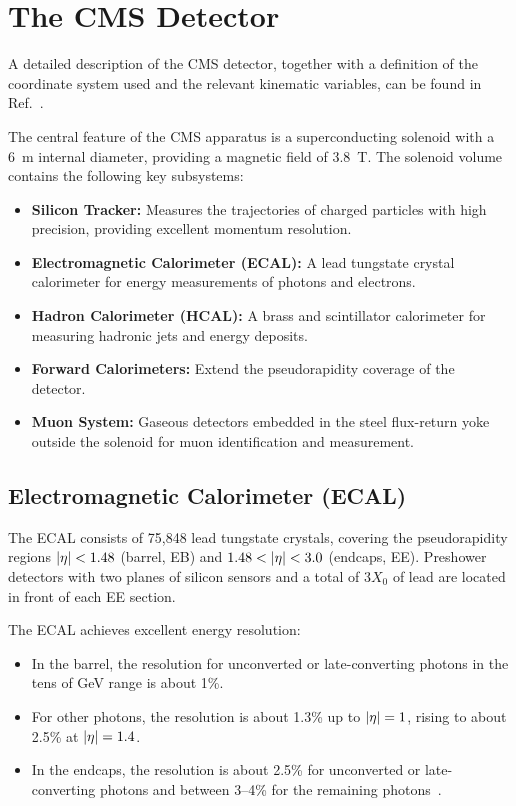 \chapter{The CMS Detector}
\label{ch:cms_detector}

A detailed description of the CMS detector, together with a definition of the coordinate system
used and the relevant kinematic variables, can be found in Ref.~\cite{Chatrchyan:2008zzk}.

The central feature of the CMS apparatus is a superconducting solenoid with a 6~\unit{m}
internal diameter, providing a magnetic field of 3.8~\unit{T}.
The solenoid volume contains the following key subsystems:
\begin{itemize}
    \item \textbf{Silicon Tracker:} Measures the trajectories of charged particles with high precision,
    providing excellent momentum resolution.
    \item \textbf{Electromagnetic Calorimeter (ECAL):} A lead tungstate crystal calorimeter for
    energy measurements of photons and electrons.
    \item \textbf{Hadron Calorimeter (HCAL):} A brass and scintillator calorimeter for measuring
    hadronic jets and energy deposits.
    \item \textbf{Forward Calorimeters:} Extend the pseudorapidity coverage of the detector.
    \item \textbf{Muon System:} Gaseous detectors embedded in the steel flux-return yoke outside
    the solenoid for muon identification and measurement.
\end{itemize}

\section*{Electromagnetic Calorimeter (ECAL)}

The ECAL consists of 75,848 lead tungstate crystals, covering the pseudorapidity regions
$\lvert \eta \rvert < 1.48$ (barrel, EB) and $1.48 < \lvert \eta \rvert < 3.0$ (endcaps, EE).
Preshower detectors with two planes of silicon sensors and a total of $3 X_0$ of lead are
located in front of each EE section.

The ECAL achieves excellent energy resolution:
\begin{itemize}
    \item In the barrel, the resolution for unconverted or late-converting photons in the tens of
    GeV range is about 1\%.
    \item For other photons, the resolution is about 1.3\% up to $\lvert \eta \rvert = 1$, rising to
    about 2.5\% at $\lvert \eta \rvert = 1.4$.
    \item In the endcaps, the resolution is about 2.5\% for unconverted or late-converting photons
    and between 3--4\% for the remaining photons~\cite{CMS:2015myp}.
\end{itemize}

